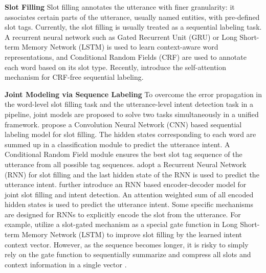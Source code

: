 \documentclass[11pt,a4paper,hyphens]{article}
\begin{document}
\noindent\textbf{Slot Filling}
Slot filling annotates the utterance with finer granularity: it associates certain parts of the utterance, usually named entities, with pre-defined slot tags. Currently, the slot filling is usually treated as a sequential labeling task. A recurrent neural network such as Gated Recurrent Unit (GRU) or Long Short-term Memory Network (LSTM) is used to learn context-aware word representations, and Conditional Random Fields (CRF) are used to annotate each word based on its slot type. Recently, \citet{shen2017disan, tan2017deep} introduce the self-attention mechanism for CRF-free sequential labeling.

\noindent\textbf{Joint Modeling via Sequence Labeling}
To overcome the error propagation in the word-level slot filling task and the utterance-level intent detection task in a pipeline, joint models are proposed to solve two tasks simultaneously in a unified framework.
\citet{xu2013convolutional} propose a Convolution Neural Network (CNN) based sequential labeling model for slot filling. The hidden states corresponding to each word are summed up in a classification module to predict the utterance intent. A Conditional Random Field module ensures the best slot tag sequence of the utterance from all possible tag sequences.
\citet{hakkani2016multi} adopt a Recurrent Neural Network (RNN) for slot filling and the last hidden state of the RNN is used to predict the utterance intent. 
\citet{liu2016attention} further introduce an RNN based encoder-decoder model for joint slot filling and intent detection. An attention weighted sum of all encoded hidden states is used to predict the utterance intent.
Some specific mechanisms are designed for RNNs to explicitly encode the slot from the utterance. For example, \citet{goo2018slot} utilize a slot-gated mechanism as a special gate function in Long Short-term Memory Network (LSTM) to improve slot filling by the learned intent context vector.
However, as the sequence becomes longer, it is risky to simply rely on the gate function to sequentially summarize and compress all slots and context information in a single vector \cite{cheng2016long}.
\end{document}
